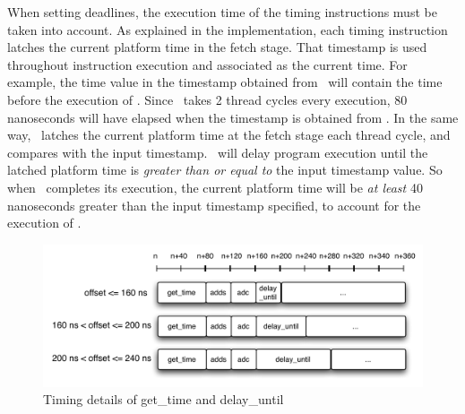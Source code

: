 When setting deadlines, the execution time of the timing instructions must be taken into account. 
As explained in the implementation, each timing instruction latches the current platform time in the fetch stage.
That timestamp is used throughout instruction execution and associated as the current time.  
For example, the time value in the timestamp obtained from \gettime\ will contain the time before the execution of \gettime.
Since \gettime\ takes 2 thread cycles every execution, 80 nanoseconds will have elapsed when the timestamp is obtained from \gettime.
In the same way, \delayuntil\ latches the current platform time at the fetch stage each thread cycle, and compares with the input timestamp. 
\Delayuntil\ will delay program execution until the latched platform time is \emph{greater than or equal to} the input timestamp value.
So when \delayuntil\ completes its execution, the current platform time will be \emph{at least} 40 nanoseconds greater than the input timestamp specified, to account for the execution of \delayuntil. 

\begin{figure}[h]
  \begin{center}
    \includegraphics[scale=.7]{figs/delay_until_details}
  \end{center}
  \vspace{-10mm}
  \caption{Timing details of get\_time and delay\_until}
  \label{fig:delay_until_details}
\end{figure}

